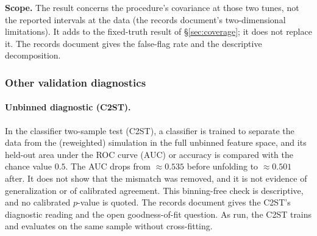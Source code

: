 \textbf{Scope.} The result concerns the procedure's covariance at those two tunes, not the reported intervals at the data (the records document's two-dimensional limitations). It adds to the fixed-truth result of \S\ref{sec:coverage}; it does not replace it. The records document gives the false-flag rate and the descriptive decomposition.

\subsubsection{Other validation diagnostics}
\label{sec:val-other}

\paragraph{Unbinned diagnostic (C2ST).} In the classifier two-sample test (C2ST), a classifier is trained to separate the data from the (reweighted) simulation in the full unbinned feature space, and its held-out area under the ROC curve (AUC) or accuracy is compared with the chance value $0.5$. The AUC drops from $\approx0.535$ before unfolding to $\approx0.501$ after. It does not show that the mismatch was removed, and it is not evidence of generalization or of calibrated agreement. This binning-free check is descriptive, and no calibrated $p$-value is quoted. The records document gives the C2ST's diagnostic reading and the open goodness-of-fit question. As run, the C2ST trains and evaluates on the same sample without cross-fitting.

